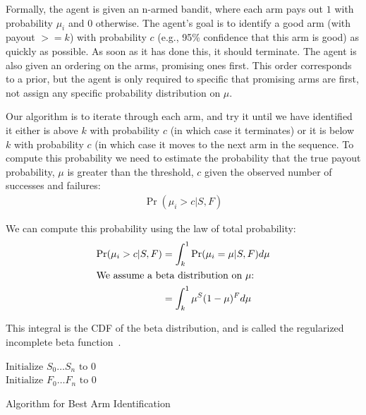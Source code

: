 \documentclass{article}
\newcommand{\algorithmC}{Ordered Confidence Bound}
\begin{document}
Formally, the agent is given an n-armed bandit, where each arm pays
out $1$ with probability $\mu_i$ and $0$ otherwise.  The agent's goal
is to identify a good arm (with payout $>= k$) with probability $c$
(e.g., 95\% confidence that this arm is good) as quickly as possible.
As soon as it has done this, it should terminate.  The agent is also
given an ordering on the arms, promising ones first.  This order
corresponds to a prior, but the agent is only required to specific
that promising arms are first, not assign any specific probability
distribution on $\mu$.


Our algorithm is to iterate through each arm, and try it until we have
identified it either is above $k$ with probability $c$ (in which case
it terminates) or it is below $k$ with probability $c$ (in which case
it moves to the next arm in the sequence.  To compute this probability
we need to estimate the probability that the true payout probability,
$\mu$ is greater than the threshold, $c$ given the observed number of
successes and failures:
\begin{align}
\Pr(\mu_i > c|  S, F)
\end{align}

We can compute this probability using the law of total probability:
\begin{align}
\Pr(\mu_i > c|  S, F) &= \int_k^1 \Pr(\mu_i=\mu | S, F) d\mu\\
\intertext{We assume a beta distribution on $\mu$:}
                      &= \int_k^1 \mu^S (1- \mu) ^F d\mu
\end{align}

This integral is the CDF of the beta distribution, and is called the
regularized incomplete beta function~\citep{olver10}. 

\begin{algorithm}
\SetKwFunction{x}{\algorithmC}


$\mbox{Initialize } S_0 \dots S_n \mbox{ to } 0$\\
$\mbox{Initialize } F_0 \dots F_n \mbox{ to } 0$\\

\caption{Algorithm for Best Arm Identification\label{alg:bandit}}
\end{algorithm}
\end{document}

